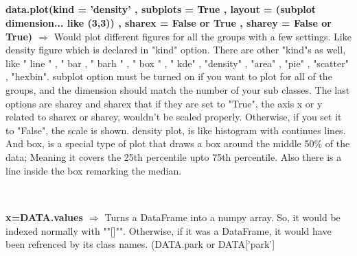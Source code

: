 \documentclass[a4paper,18pt]{article}
\begin{document}
\subsection{\colorbox {matgreen}{\color{white}{\large data.plot(Options)}}}
\textbf{data.plot(kind = 'density' , subplots = True , layout = (subplot dimension... like (3,3)) , sharex = False or True , sharey = False or True) $\Rightarrow$} Would plot different figures for all the groups with a few settings. Like density figure which is declared in "kind" option. There are other "kind"s as well, like " line " , " bar  , " barh " , " box " , " kde" , "density" , "area" , "pie" , "scatter" , "hexbin". subplot option must be turned on if you want to plot for all of the groups, and the dimension should match the number of your sub classes. The last options are sharey and sharex that if they are set to "True", the axis x or y related to sharex or sharey, wouldn't be scaled properly. Otherwise, if you set it to "False", the scale is shown. 
density plot, is like histogram with continues lines. And box, is a special type of plot that draws a box around the middle 50\% of the data; Meaning it covers the 25th percentile upto 75th percentile. Also there is a line inside the box remarking the median.\\\\


\subsection{\colorbox {matgreen}{\color{white}{\large DATA.values}}}
\textbf{x=DATA.values $\Rightarrow$} Turns a DataFrame into a numpy array. So, it would be indexed normally with ""[]"". Otherwise, if it was a DataFrame, it would have been refrenced by its class names. (DATA.park or DATA['park'] \\\\


\newpage

\section{\colorbox {Abi}{}}
\end{document}
